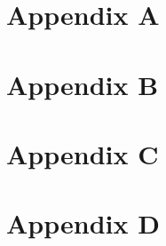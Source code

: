\chapter{Appendix A}
\label{ap:appendixA}


\chapter{Appendix B}
\label{ap:appendixB}


\chapter{Appendix C}
\label{ap:appendixC}


\chapter{Appendix D}
\label{ap:appendixD}


